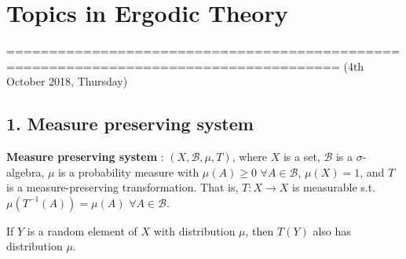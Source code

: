 \documentclass[10pt,a4paper]{report}
\DeclarePairedDelimiter\bignorm{\lVert}{\rVert}
\begin{document}
\newcommand{\thm}{\textbf{Theorem) }}
\newcommand{\thmnum}[1]{\textbf{Theorem #1) }}
\newcommand{\defi}{\textbf{Definition) }}
\newcommand{\lem}{\textbf{Lemma) }}
\newcommand{\lemnum}[1]{\textbf{Lemma #1) }}
\newcommand{\prop}{\textbf{Proposition) }}
\newcommand{\pf}{\textbf{proof) }}
\newcommand{\cor}{\textbf{Corollary) }}
\newcommand{\cornum}[1]{\textbf{Corollary #1) }}

\newcommand{\lap}{\triangle} %
\newcommand{\s}{\vspace{10pt}}
\newcommand{\bull}{$\bullet$}
\newcommand{\sta}{$\star$}
\newcommand{\reals}{\mathbb{R}}

\newcommand{\eop}{\hfill  \textsl{(End of proof)} $\square$} %

\newcommand{\intN}{\mathbb{Z}_N}
\newcommand{\norms}[2]{\bignorm[\big]{#1}_{#2}}
\newcommand{\abs}[1]{\big| #1 \big|}
\newcommand{\avg}{\mathbb{E}}
\newcommand{\borel}{\mathscr{B}}
\newcommand{\setlimsup}[2]{\bigcap_{#1=1}^{\infty}\bigcup_{#2=#1}^{\infty}}
\newcommand{\dlim}{D-\lim}
\newcommand{\clim}{C-\lim}

\newcommand{\newday}{======================================================================}
\newcommand{\digression}{**********************************************************************************************}

\setlength\parindent{0pt}
\noindent

\chapter*{Topics in Ergodic Theory}
\s

=====================================================================================
(4th October 2018, Thursday)
\s

\section*{1. Measure preserving system}

\textbf{Measure preserving system} : $(X, \borel, \mu, T)$, where $X$ is a set, $\borel$ is a $\sigma$-algebra, $\mu$ is a probability measure with $\mu(A) \geq 0$ $\forall A \in \borel$, $\mu(X)=1$, and $T$ is a measure-preserving transformation. That is, $T: X\rightarrow X$ is measurable s.t. $\mu(T^{-1}(A)) = \mu(A)$ $\forall A \in \borel$.
\s

If $Y$ is a random element of $X$ with distribution $\mu$, then $T(Y)$ also has distribution $\mu$.
\s
\end{document}
